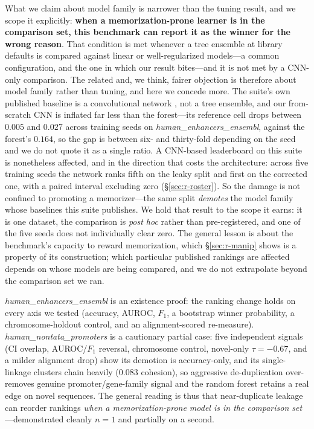 \documentclass[webpdf,modern,large,namedate]{oup-authoring-template}%
\begin{document}
What we claim about model family is narrower than the tuning result, and we scope it explicitly: \textbf{when a memorization-prone learner is in the comparison set, this benchmark can report it as the winner for the wrong reason}. That condition is met whenever a tree ensemble at library defaults is compared against linear or well-regularized models---a common configuration, and the one in which our result bites---and it is not met by a CNN-only comparison. The related and, we think, fairer objection is therefore about model family rather than tuning, and here we concede more. The suite's own published baseline is a convolutional network \citep{gresova2023}, not a tree ensemble, and our from-scratch CNN is inflated far less than the forest---its reference cell drops between $0.005$ and $0.027$ across training seeds on \textit{human\_enhancers\_ensembl}, against the forest's $0.164$, so the gap is between six- and thirty-fold depending on the seed and we do not quote it as a single ratio. A CNN-based leaderboard on this suite is nonetheless affected, and in the direction that costs the architecture: across five training seeds the network ranks fifth on the leaky split and first on the corrected one, with a paired interval excluding zero (\S\ref{sec:r-roster}). So the damage is not confined to promoting a memorizer---the same split \emph{demotes} the model family whose baselines this suite publishes. We hold that result to the scope it earns: it is one dataset, the comparison is \emph{post hoc} rather than pre-registered, and one of the five seeds does not individually clear zero. The general lesson is about the benchmark's capacity to reward memorization, which \S\ref{sec:r-manip} shows is a property of its construction; which particular published rankings are affected depends on whose models are being compared, and we do not extrapolate beyond the comparison set we ran.

\textit{human\_enhancers\_ensembl} is an existence proof: the ranking change holds on every axis we tested (accuracy, AUROC, $F_1$, a bootstrap winner probability, a chromosome-holdout control, and an alignment-scored re-measure). \textit{human\_nontata\_promoters} is a cautionary partial case: five independent signals (CI overlap, AUROC/$F_1$ reversal, chromosome control, novel-only $\tau=-0.67$, and a milder alignment drop) show its demotion is accuracy-only, and its single-linkage clusters chain heavily ($0.083$ cohesion), so aggressive de-duplication over-removes genuine promoter/gene-family signal and the random forest retains a real edge on novel sequences. The general reading is thus that near-duplicate leakage can reorder rankings \emph{when a memorization-prone model is in the comparison set}---demonstrated cleanly $n{=}1$ and partially on a second.
\end{document}
